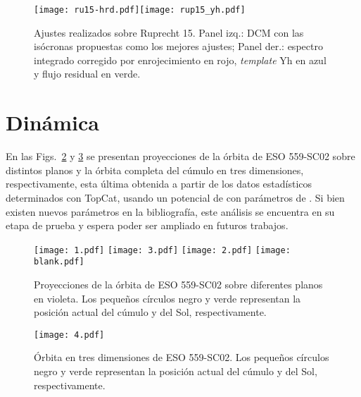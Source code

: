 \documentclass[baaa]{baaa}
\begin{document}
\begin{figure}
    \centering
    \texttt{[image: ru15-hrd.pdf]}\texttt{[image: rup15\_yh.pdf]}
    \caption{Ajustes realizados sobre Ruprecht 15. Panel izq.: DCM con las is\'ocronas propuestas como los mejores ajustes; Panel der.: espectro integrado corregido por enrojecimiento en rojo, {\em template} Yh en azul y flujo residual en verde.}
    \label{fig3}
\end{figure}

\section{Din\'amica}\label{s_5}
En las Figs.~\ref{fig4} y \ref{fig5} se presentan proyecciones de la \'orbita de ESO 559-SC02 sobre distintos planos y la \'orbita completa del c\'umulo en tres dimensiones, respectivamente, esta \'ultima obtenida a partir de los datos estad\'isticos determinados con {\sc TopCat}, usando un potencial de \cite{M75} con par\'ametros de \cite{AS91}. Si bien existen nuevos par\'ametros en la bibliograf\'ia, este an\'alisis se encuentra en su etapa de prueba y espera poder ser ampliado en futuros trabajos.

\begin{figure}
    \centering
    \texttt{[image: 1.pdf]}
    \hfill
    \texttt{[image: 3.pdf]}
    \texttt{[image: 2.pdf]}
    \hfill
    \texttt{[image: blank.pdf]}
    \caption{Proyecciones de la \'orbita de ESO 559-SC02 sobre diferentes planos en violeta. Los peque\~nos c\'irculos negro y verde representan la posici\'on actual del c\'umulo y del Sol, respectivamente.}
    \label{fig4}
\end{figure}

\begin{figure}
    \centering
    \texttt{[image: 4.pdf]}
    \caption{\'Orbita en tres dimensiones de ESO 559-SC02. Los peque\~nos c\'irculos negro y verde representan la posici\'on actual del c\'umulo y del Sol, respectivamente.}
    \label{fig5}
\end{figure}
\end{document}
